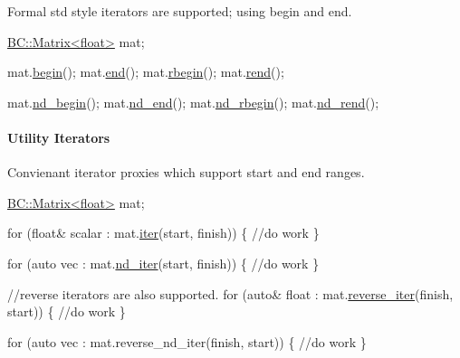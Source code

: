 Formal {\ttfamily std} style iterators are supported; using {\ttfamily begin} and {\ttfamily end}.


\begin{DoxyCode}
\hyperlink{classBC_1_1tensors_1_1Tensor__Base}{BC::Matrix<float>} mat; 

  mat.\hyperlink{classBC_1_1tensors_1_1Tensor__IterAlgos_a73b44ff31a6c22a172e03f31af4e4d64}{begin}();        
  mat.\hyperlink{classBC_1_1tensors_1_1Tensor__IterAlgos_a5bb5cbc94944c7225db9fd594656f011}{end}();
  mat.\hyperlink{classBC_1_1tensors_1_1Tensor__IterAlgos_a10c1cb1d7095d33b9cc549aa44e98fec}{rbegin}();
  mat.\hyperlink{classBC_1_1tensors_1_1Tensor__IterAlgos_adec36bd5bba166de15c61579fcd5119b}{rend}();

  mat.\hyperlink{classBC_1_1tensors_1_1Tensor__IterAlgos_a791e906b41519aa00b5936c90f6691f9}{nd\_begin}();
  mat.\hyperlink{classBC_1_1tensors_1_1Tensor__IterAlgos_a57c16c64298dc18b878a50048bd2ffee}{nd\_end}();
  mat.\hyperlink{classBC_1_1tensors_1_1Tensor__IterAlgos_a23ce58f5b1563c197ed95719914d4a46}{nd\_rbegin}();
  mat.\hyperlink{classBC_1_1tensors_1_1Tensor__IterAlgos_a8109154106e723b1957c6c22e14ab9b5}{nd\_rend}();
\end{DoxyCode}
 \paragraph*{Utility Iterators}

Convienant iterator proxies which support start and end ranges.


\begin{DoxyCode}
\hyperlink{classBC_1_1tensors_1_1Tensor__Base}{BC::Matrix<float>} mat; 

  \textcolor{keywordflow}{for} (\textcolor{keywordtype}{float}& scalar : mat.\hyperlink{classBC_1_1tensors_1_1Tensor__IterAlgos_a5a6fe492656230dba26f4736215170f5}{iter}(start, finish)) \{
    \textcolor{comment}{//do work}
  \}

  \textcolor{keywordflow}{for} (\textcolor{keyword}{auto} vec : mat.\hyperlink{classBC_1_1tensors_1_1Tensor__IterAlgos_a31a31f7f95cda12e59c24e9c483a1a70}{nd\_iter}(start, finish)) \{
    \textcolor{comment}{//do work}
  \}

  \textcolor{comment}{//reverse iterators are also supported.}
  \textcolor{keywordflow}{for} (\textcolor{keyword}{auto}& \textcolor{keywordtype}{float} : mat.\hyperlink{classBC_1_1tensors_1_1Tensor__IterAlgos_af992794919c12bb33558db90082e9f5a}{reverse\_iter}(finish, start)) \{
    \textcolor{comment}{//do work}
  \}

    \textcolor{keywordflow}{for} (\textcolor{keyword}{auto} vec : mat.reverse\_nd\_iter(finish, start)) \{
    \textcolor{comment}{//do work}
  \}
\end{DoxyCode}
 